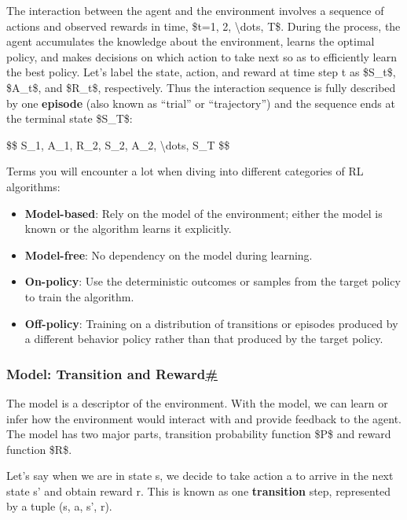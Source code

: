 The interaction between the agent and the environment involves a sequence of actions and observed rewards in time, \$t=1, 2, \textbackslash dots, T\$. During the process, the agent accumulates the knowledge about the environment, learns the optimal policy, and makes decisions on which action to take next so as to efficiently learn the best policy. Let's label the state, action, and reward at time step t as \$S\_t\$, \$A\_t\$, and \$R\_t\$, respectively. Thus the interaction sequence is fully described by one \textbf{episode} (also known as ``trial'' or ``trajectory'') and the sequence ends at the terminal state \$S\_T\$:

\$\$ S\_1, A\_1, R\_2, S\_2, A\_2, \textbackslash dots, S\_T \$\$

Terms you will encounter a lot when diving into different categories of RL algorithms:

\begin{itemize}
\tightlist
\item
  \textbf{Model-based}: Rely on the model of the environment; either the model is known or the algorithm learns it explicitly.
\item
  \textbf{Model-free}: No dependency on the model during learning.
\item
  \textbf{On-policy}: Use the deterministic outcomes or samples from the target policy to train the algorithm.
\item
  \textbf{Off-policy}: Training on a distribution of transitions or episodes produced by a different behavior policy rather than that produced by the target policy.
\end{itemize}

\subsubsection{\texorpdfstring{Model: Transition and Reward\hyperref[model-transition-and-reward]{\#}}{Model: Transition and Reward\#}}\label{model-transition-and-reward}

The model is a descriptor of the environment. With the model, we can learn or infer how the environment would interact with and provide feedback to the agent. The model has two major parts, transition probability function \$P\$ and reward function \$R\$.

Let's say when we are in state s, we decide to take action a to arrive in the next state s' and obtain reward r. This is known as one \textbf{transition} step, represented by a tuple (s, a, s', r).

